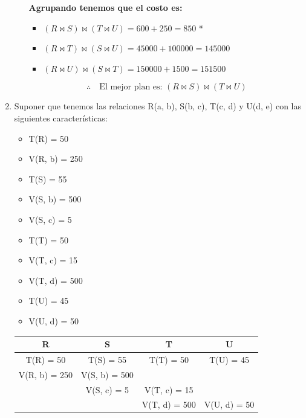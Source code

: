\documentclass{templateNote}
\newcommand{\newparagraph}{\par\vspace{\baselineskip}\noindent}
\begin{document}
\begin{enumerate}
\begin{enumerate}[label=\arabic*)]
        \textbf{Agrupando tenemos que el costo es:}
        \begin{itemize}
            \item $(R \Join S) \Join (T \Join U) = 600 + 250 = 850$ *
            \item $(R \Join T) \Join (S \Join U) = 45000 + 100000 = 145000$
            \item $(R \Join U) \Join (S \Join T) = 150000 + 1500 = 151500$
        \end{itemize}

        \begin{equation*}
            \therefore \quad \text{El mejor plan es: } (R \Join S) \Join (T \Join U)
        \end{equation*}
    \end{enumerate}

    \newpage
    \item Suponer que tenemos las relaciones R(a, b), S(b, c), T(c, d) y U(d, e) con las siguientes características:
    \newparagraph
    \begin{minipage}{0.5\textwidth}
        \begin{itemize}
            \item T(R) = 50
            \item V(R, b) = 250
            \item T(S) = 55
            \item V(S, b) = 500
            \item V(S, c) = 5
        \end{itemize}
    \end{minipage}
    \hfill
    \begin{minipage}{0.5\textwidth}
        \begin{itemize}
            \item T(T) = 50
            \item V(T, c) = 15
            \item V(T, d) = 500
            \item T(U) = 45
            \item V(U, d) = 50
        \end{itemize}
    \end{minipage}
    \begin{center}
        \begin{tabular}{|c|c|c|c|}
            \hline
            R & S & T & U \\
            \hline
            T(R) = 50 & T(S) = 55 & T(T) = 50 & T(U) = 45 \\
            V(R, b) = 250 & V(S, b) = 500 & & \\
            & V(S, c) = 5 & V(T, c) = 15 & \\
            & & V(T, d) = 500 & V(U, d) = 50 \\
            \hline
        \end{tabular}
    \end{center}
    \newparagraph


\end{enumerate}
\end{document}
